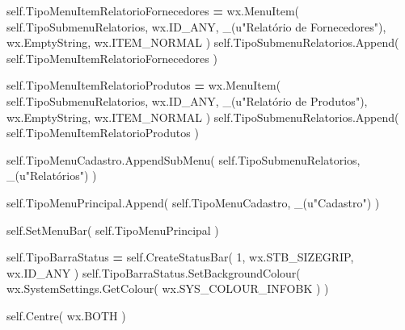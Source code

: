 \documentclass[
]{book}
\newenvironment{Shaded}{\begin{snugshade}}{\end{snugshade}}
\newcommand{\DecValTok}[1]{\textcolor[rgb]{0.00,0.00,0.81}{#1}}
\newcommand{\NormalTok}[1]{#1}
\newcommand{\OperatorTok}[1]{\textcolor[rgb]{0.81,0.36,0.00}{\textbf{#1}}}
\newcommand{\StringTok}[1]{\textcolor[rgb]{0.31,0.60,0.02}{#1}}
\newcommand{\VariableTok}[1]{\textcolor[rgb]{0.00,0.00,0.00}{#1}}
\begin{document}
\begin{Shaded}
\begin{Highlighting}[]
       \VariableTok{self}\NormalTok{.TipoMenuItemRelatorioFornecedores }\OperatorTok{=}\NormalTok{ wx.MenuItem( }\VariableTok{self}\NormalTok{.TipoSubmenuRelatorios, wx.ID\_ANY, \_(}\StringTok{u"Relatório de Fornecedores"}\NormalTok{), wx.EmptyString, wx.ITEM\_NORMAL )}
       \VariableTok{self}\NormalTok{.TipoSubmenuRelatorios.Append( }\VariableTok{self}\NormalTok{.TipoMenuItemRelatorioFornecedores )}

       \VariableTok{self}\NormalTok{.TipoMenuItemRelatorioProdutos }\OperatorTok{=}\NormalTok{ wx.MenuItem( }\VariableTok{self}\NormalTok{.TipoSubmenuRelatorios, wx.ID\_ANY, \_(}\StringTok{u"Relatório de Produtos"}\NormalTok{), wx.EmptyString, wx.ITEM\_NORMAL )}
       \VariableTok{self}\NormalTok{.TipoSubmenuRelatorios.Append( }\VariableTok{self}\NormalTok{.TipoMenuItemRelatorioProdutos )}

       \VariableTok{self}\NormalTok{.TipoMenuCadastro.AppendSubMenu( }\VariableTok{self}\NormalTok{.TipoSubmenuRelatorios, \_(}\StringTok{u"Relatórios"}\NormalTok{) )}

       \VariableTok{self}\NormalTok{.TipoMenuPrincipal.Append( }\VariableTok{self}\NormalTok{.TipoMenuCadastro, \_(}\StringTok{u"Cadastro"}\NormalTok{) )}

       \VariableTok{self}\NormalTok{.SetMenuBar( }\VariableTok{self}\NormalTok{.TipoMenuPrincipal )}

       \VariableTok{self}\NormalTok{.TipoBarraStatus }\OperatorTok{=} \VariableTok{self}\NormalTok{.CreateStatusBar( }\DecValTok{1}\NormalTok{, wx.STB\_SIZEGRIP, wx.ID\_ANY )}
       \VariableTok{self}\NormalTok{.TipoBarraStatus.SetBackgroundColour( wx.SystemSettings.GetColour( wx.SYS\_COLOUR\_INFOBK ) )}


       \VariableTok{self}\NormalTok{.Centre( wx.BOTH )}


\end{Highlighting}
\end{Shaded}
\end{document}

